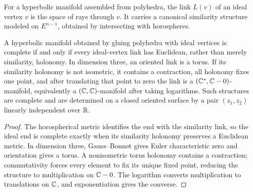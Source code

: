 \begin{definition}
\label{thurston-ch03-ideal-link}

For a hyperbolic manifold assembled from polyhedra, the link \(L(v)\) of an ideal vertex \(v\) is the space of rays through \(v\). It carries a canonical similarity structure modeled on \(E^{n-1}\), obtained by intersecting with horospheres.
\end{definition}

\begin{theorem}
\label{thurston-ch03-ideal-polyhedra-completeness}

A hyperbolic manifold obtained by gluing polyhedra with ideal vertices is complete if and only if every ideal-vertex link has Euclidean, rather than merely similarity, holonomy. In dimension three, an oriented link is a torus. If its similarity holonomy is not isometric, it contains a contraction, all holonomy fixes one point, and after translating that point to zero the link is a \((\mathbb{C}^*,\mathbb{C}-0)\)-manifold, equivalently a \((\mathbb{C},\mathbb{C})\)-manifold after taking logarithms. Such structures are complete and are determined on a closed oriented surface by a pair \((z_1,z_2)\) linearly independent over \(\mathbb{R}\).
\end{theorem}
\begin{proof}
\sketch The horospherical metric identifies the end with the similarity link, so the ideal end is complete exactly when its similarity holonomy preserves a Euclidean metric. In dimension three, Gauss--Bonnet gives Euler characteristic zero and orientation gives a torus. A nonisometric torus holonomy contains a contraction; commutativity forces every element to fix its unique fixed point, reducing the structure to multiplication on \(\mathbb{C}-0\). The logarithm converts multiplication to translations on \(\mathbb{C}\), and exponentiation gives the converse.
\end{proof}
